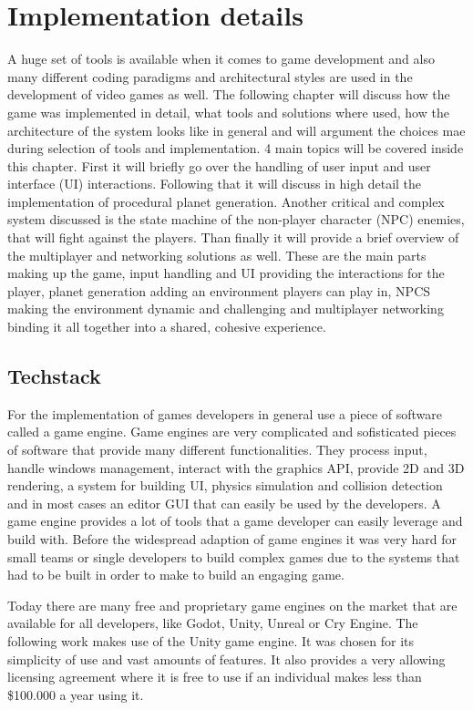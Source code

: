 \documentclass[12pt]{report}
\begin{document}
\chapter{Implementation details}

A huge set of tools is available when it comes to game development and also many different coding paradigms and architectural styles are used in the development of video games as well. The following chapter will discuss how the game was implemented in detail, what tools and solutions where used, how the architecture of the system looks like in general and will argument the choices mae during selection of tools and implementation. 
4 main topics will be covered inside this chapter. First it will briefly go over the handling of user input and user interface (UI) interactions. Following that it will discuss in high detail the implementation of procedural planet generation. Another critical and complex system discussed is the state machine of the non-player character (NPC) enemies, that will fight against the players. Than finally it will provide a brief overview of the multiplayer and networking solutions as well.
These are the main parts making up the game, input handling and UI providing the interactions for the player, planet generation adding an environment players can play in, NPCS making the environment dynamic and challenging and multiplayer networking binding it all together into a shared, cohesive experience.

\section{Techstack}
For the implementation of games developers in general use a piece of software called a game engine. Game engines are very complicated and sofisticated pieces of software that provide many different functionalities. They process input, handle windows management, interact with the graphics API, provide 2D and 3D rendering, a system for building UI, physics simulation and collision detection and in most cases an editor GUI that can easily be used by the developers.
A game engine provides a lot of tools that a game developer can easily leverage and build with. Before the widespread adaption of game engines it was very hard for small teams or single developers to build complex games due to the systems that had to be built in order to make to build an engaging game.

Today there are many free and proprietary game engines on the market that are available for all developers, like Godot, Unity, Unreal or Cry Engine. The following work makes use of the Unity game engine. It was chosen for its simplicity of use and vast amounts of features. It also provides a very allowing licensing agreement where it is free to use if an individual makes less than \$100.000 a year using it.
\end{document}
